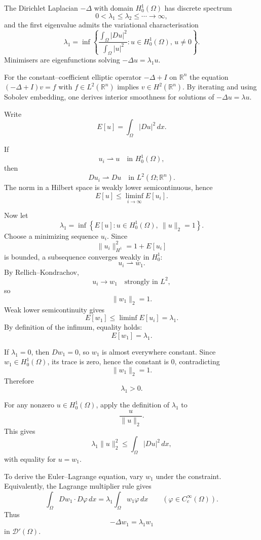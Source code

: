 \begin{problem}[CP-II-0229]
The Dirichlet Laplacian $-\Delta$ with domain $H_0^1(\Omega)$ has discrete
spectrum
\[
0<\lambda_1\le\lambda_2\le\cdots\to\infty,
\]
and the first eigenvalue admits the variational characterisation
\[
\lambda_1 = \inf\left\{
\frac{\int_\Omega |Du|^2}{\int_\Omega |u|^2}
: u\in H_0^1(\Omega),\,u\neq 0\right\}.
\]
Minimisers are eigenfunctions solving $-\Delta u=\lambda_1 u$.

For the constant--coefficient elliptic operator $-\Delta+I$ on $\mathbb{R}^n$
the equation $(-\Delta+I)v=f$ with $f\in L^2(\mathbb{R}^n)$ implies
$v\in H^2(\mathbb{R}^n)$. By iterating and using Sobolev embedding, one
derives interior smoothness for solutions of $-\Delta u = \lambda u$.
\end{problem}

\begin{solution}
Write
\[
E[u]=\int_\Omega|Du|^2\,dx.
\]

If
\[
u_i\rightharpoonup u
\quad\text{in }H_0^1(\Omega),
\]
then
\[
Du_i\rightharpoonup Du
\quad\text{in }L^2(\Omega;\mathbb R^n).
\]
The norm in a Hilbert space is weakly lower semicontinuous, hence
\[
\boxed{
E[u]\le\liminf_{i\to\infty}E[u_i].
}
\]

Now let
\[
\lambda_1
=
\inf\left\{
E[u]:
u\in H_0^1(\Omega),\ \|u\|_2=1
\right\}.
\]
Choose a minimizing sequence \(u_i\). Since
\[
\|u_i\|_{H^1}^2
=
1+E[u_i]
\]
is bounded, a subsequence converges weakly in \(H_0^1\):
\[
u_i\rightharpoonup w_1.
\]
By Rellich--Kondrachov,
\[
u_i\to w_1
\quad\text{strongly in }L^2,
\]
so
\[
\|w_1\|_2=1.
\]
Weak lower semicontinuity gives
\[
E[w_1]
\le
\liminf E[u_i]
=
\lambda_1.
\]
By definition of the infimum, equality holds:
\[
E[w_1]=\lambda_1.
\]

If \(\lambda_1=0\), then \(Dw_1=0\), so \(w_1\) is almost everywhere constant. Since \(w_1\in H_0^1(\Omega)\), its trace is zero, hence the constant is \(0\), contradicting
\[
\|w_1\|_2=1.
\]
Therefore
\[
\boxed{\lambda_1>0.}
\]

For any nonzero \(u\in H_0^1(\Omega)\), apply the definition of \(\lambda_1\) to
\[
\frac{u}{\|u\|_2}.
\]
This gives
\[
\boxed{
\lambda_1\|u\|_2^2
\le
\int_\Omega|Du|^2\,dx,
}
\]
with equality for \(u=w_1\).

To derive the Euler--Lagrange equation, vary \(w_1\) under the constraint. Equivalently, the Lagrange multiplier rule gives
\[
\int_\Omega Dw_1\cdot D\varphi\,dx
=
\lambda_1
\int_\Omega w_1\varphi\,dx
\qquad
(\varphi\in C_c^\infty(\Omega)).
\]
Thus
\[
\boxed{
-\Delta w_1=\lambda_1w_1
}
\]
in \(\mathcal D'(\Omega)\).


\end{solution}
